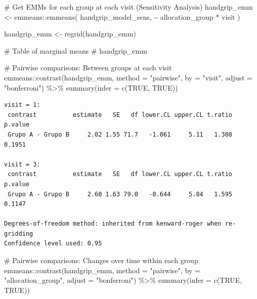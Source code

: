 \documentclass[
  12pt,
]{article}
\newenvironment{Shaded}{\begin{snugshade}}{\end{snugshade}}
\newcommand{\AttributeTok}[1]{\textcolor[rgb]{0.40,0.45,0.13}{#1}}
\newcommand{\CommentTok}[1]{\textcolor[rgb]{0.37,0.37,0.37}{#1}}
\newcommand{\ConstantTok}[1]{\textcolor[rgb]{0.56,0.35,0.01}{#1}}
\newcommand{\FunctionTok}[1]{\textcolor[rgb]{0.28,0.35,0.67}{#1}}
\newcommand{\NormalTok}[1]{\textcolor[rgb]{0.00,0.23,0.31}{#1}}
\newcommand{\OtherTok}[1]{\textcolor[rgb]{0.00,0.23,0.31}{#1}}
\newcommand{\SpecialCharTok}[1]{\textcolor[rgb]{0.37,0.37,0.37}{#1}}
\newcommand{\StringTok}[1]{\textcolor[rgb]{0.13,0.47,0.30}{#1}}
\begin{document}
\begin{Shaded}
\begin{Highlighting}[]
\CommentTok{\# Get EMMs for each group at each visit (Sensitivity Analysis)}
\NormalTok{handgrip\_emm }\OtherTok{\textless{}{-}}\NormalTok{ emmeans}\SpecialCharTok{::}\FunctionTok{emmeans}\NormalTok{(}
\NormalTok{    handgrip\_model\_sens, }
    \SpecialCharTok{\textasciitilde{}}\NormalTok{ allocation\_group }\SpecialCharTok{*}\NormalTok{ visit}
\NormalTok{)}

\NormalTok{handgrip\_emm }\OtherTok{\textless{}{-}} \FunctionTok{regrid}\NormalTok{(handgrip\_emm)}

\CommentTok{\# Table of marginal means}
\CommentTok{\# handgrip\_emm}

\CommentTok{\# Pairwise comparisons: Between groups at each visit}
\NormalTok{emmeans}\SpecialCharTok{::}\FunctionTok{contrast}\NormalTok{(handgrip\_emm,}
\AttributeTok{method =} \StringTok{"pairwise"}\NormalTok{, }\AttributeTok{by =} \StringTok{"visit"}\NormalTok{,}
\AttributeTok{adjust =} \StringTok{"bonferroni"}\NormalTok{) }\SpecialCharTok{\%\textgreater{}\%} \FunctionTok{summary}\NormalTok{(}\AttributeTok{infer =} \FunctionTok{c}\NormalTok{(}\ConstantTok{TRUE}\NormalTok{, }\ConstantTok{TRUE}\NormalTok{))}
\end{Highlighting}
\end{Shaded}

\begin{verbatim}
visit = 1:
 contrast          estimate   SE   df lower.CL upper.CL t.ratio p.value
 Grupo A - Grupo B     2.02 1.55 71.7   -1.061     5.11   1.308  0.1951

visit = 3:
 contrast          estimate   SE   df lower.CL upper.CL t.ratio p.value
 Grupo A - Grupo B     2.60 1.63 79.0   -0.644     5.84   1.595  0.1147

Degrees-of-freedom method: inherited from kenward-roger when re-gridding 
Confidence level used: 0.95 
\end{verbatim}

\begin{Shaded}
\begin{Highlighting}[]
\CommentTok{\# Pairwise comparisons: Changes over time within each group}
\NormalTok{emmeans}\SpecialCharTok{::}\FunctionTok{contrast}\NormalTok{(handgrip\_emm,}
\AttributeTok{method =} \StringTok{"pairwise"}\NormalTok{, }\AttributeTok{by =} \StringTok{"allocation\_group"}\NormalTok{,}
\AttributeTok{adjust =} \StringTok{"bonferroni"}\NormalTok{) }\SpecialCharTok{\%\textgreater{}\%} \FunctionTok{summary}\NormalTok{(}\AttributeTok{infer =} \FunctionTok{c}\NormalTok{(}\ConstantTok{TRUE}\NormalTok{, }\ConstantTok{TRUE}\NormalTok{))}
\end{Highlighting}
\end{Shaded}
\end{document}
